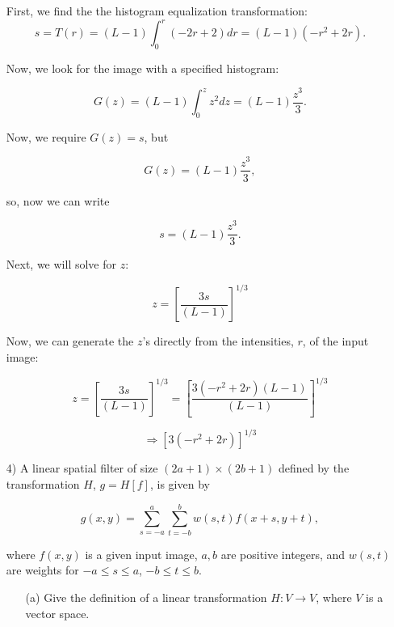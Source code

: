 \documentclass{article}
\begin{document}
\begin{enumerate}
First, we find the the histogram equalization transformation:
\begin{equation} 
s=T(r)=(L-1) \int_{0}^{r} (-2r+2)dr = (L-1)(-r^2 + 2r) .
\end{equation}

Now, we look for the image with a specified histogram:

\begin{equation}
G(z) = (L-1) \int_{0}^{z} z^2 dz = (L-1)\frac{z^3}{3} .
\end{equation}

Now, we require $G(z) = s$, but 

\begin{equation}
G(z) = (L-1) \frac{z^3}{3},
\end{equation}

so, now we can write

\begin{equation}
s=(L-1) \frac{z^3}{3}.
\end{equation}

Next, we will solve for $z$:

\begin{equation}
z=\left[ \frac{3s}{(L-1)} \right]^{1/3}
\end{equation}

Now, we can generate the $z$'s directly from the intensities, $r$, of the input image:

\begin{equation}
z=\left[ \frac{3s}{(L-1)} \right]^{1/3} = \left[ \frac{3(-r^2 + 2r)(L-1)}{(L-1)} \right]^{1/3}
\end{equation}

\begin{equation}
\Rightarrow \left[ 3(-r^2 + 2r) \right]^{1/3}
\end{equation}

\item[4)] A linear spatial filter of size $(2a+1) \times (2b+1)$ defined by the transformation $H$, $g=H[f]$, is given by

\begin{equation}
g(x,y)=\sum_{s=-a}^{a} \sum_{t=-b}^{b} w(s,t)f(x+s, y+t),
\end{equation}

where $f(x, y)$ is a given input image, $a, b$ are positive integers, and $w(s, t)$ are weights for $-a \leq s \leq a$, $-b \leq t \leq b$.

\begin{enumerate}
\item[(a)] Give the definition of a linear transformation $H : V \rightarrow V$, where $V$ is a vector space.


\end{enumerate}
\end{enumerate}
\end{document}

